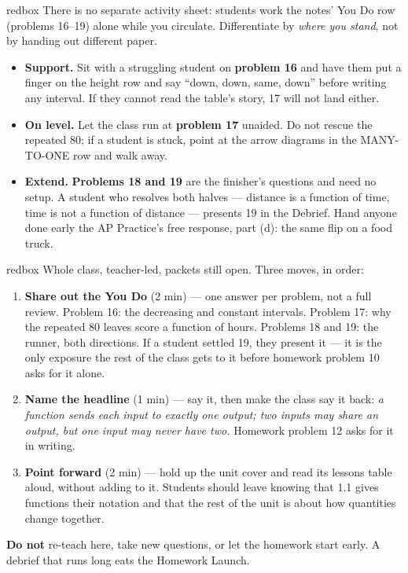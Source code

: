 \documentclass[10pt]{article}
\begin{document}
\begin{skillbox}{redbox}
There is no separate activity sheet: students work the notes' You Do row (problems
16--19) alone while you circulate. Differentiate by \textit{where you stand}, not
by handing out different paper.

\begin{itemize}
  \item \textbf{Support.} Sit with a struggling student on \textbf{problem 16} and
        have them put a finger on the height row and say ``down, down, same,
        down'' before writing any interval. If they cannot read the table's
        story, 17 will not land either.
  \item \textbf{On level.} Let the class run at \textbf{problem 17} unaided. Do not
        rescue the repeated 80; if a student is stuck, point at the arrow
        diagrams in the MANY-TO-ONE row and walk away.
  \item \textbf{Extend.} \textbf{Problems 18 and 19} are the finisher's questions
        and need no setup. A student who resolves both halves --- distance is a
        function of time, time is not a function of distance --- presents 19 in
        the Debrief. Hand anyone done early the AP Practice's free response,
        part (d): the same flip on a food truck.
\end{itemize}
\end{skillbox}

\boxguard[20]
\begin{skillbox}{redbox}
Whole class, teacher-led, packets still open. Three moves, in order:
\begin{enumerate}[itemsep=3pt]
  \item \textbf{Share out the You Do} (2 min) --- one answer per problem, not a
        full review. Problem 16: the decreasing and constant intervals. Problem
        17: why the repeated 80 leaves score a function of hours. Problems 18 and
        19: the runner, both directions. If a student settled 19, they present
        it --- it is the only exposure the rest of the class gets to it before
        homework problem 10 asks for it alone.
  \item \textbf{Name the headline} (1 min) --- say it, then make the class say it
        back: \textit{a function sends each input to exactly one output; two
        inputs may share an output, but one input may never have two.}
        Homework problem 12 asks for it in writing.
  \item \textbf{Point forward} (2 min) --- hold up the unit cover and read its
        lessons table aloud, without adding to it. Students should leave knowing
        that 1.1 gives functions their notation and that the rest of the unit is
        about how quantities change together.
\end{enumerate}
\textbf{Do not} re-teach here, take new questions, or let the homework start early.
A debrief that runs long eats the Homework Launch.
\end{skillbox}
\end{document}
